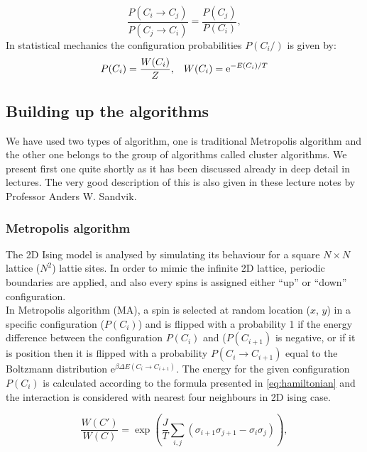 \documentclass[a4paper,8pt]{article}
\begin{document}
\begin{equation}
    \frac{P(C_i \rightarrow C_{j})}{P(C_j \rightarrow C_{i})} = \frac{P(C_j)}{P(C_i)},
\end{equation}
In statistical mechanics the configuration probabilities $P(C_{i}/)$ is given by:
\begin{equation}
    P(C_i) = \frac{W(C_i)}{Z}, \hspace{0.3cm} W(C_{i}) = \mathrm{e}^{-E(C_i)/T}
\end{equation}

\subsection{Building up the algorithms}
We have used two types of algorithm, one is traditional Metropolis algorithm\supercite{metropolis1953equation} and the other one belongs to the group of algorithms called cluster algorithms. We present first one quite shortly as it has been discussed already in deep detail in lectures. The very good description of this is also given in these lecture notes by Professor Anders W. Sandvik.\supercite{sandvik_lecture_notes}

\subsubsection{Metropolis algorithm}
The 2D Ising model is analysed by simulating its behaviour for a square $N \times N$ lattice ($N^2$) lattie sites. In order to mimic the infinite 2D lattice, periodic boundaries are applied, and also every spins is assigned either \enquote{up} or \enquote{down} configuration. \\

\noindent In Metropolis algorithm (MA), a spin is selected at random location ($x$, $y$) in a specific configuration ($P(C_i)$) and is flipped with a probability 1 if the energy difference between the configuration $P(C_i)$ and ($P(C_{i + 1})$ is negative, or if it is position then it is flipped with a probability $P(C_i \rightarrow C_{i + 1})$ equal to the Boltzmann distribution $\mathrm{e}^{\beta \Delta E(C_i \rightarrow C_{i+1})}$.  The energy for the given configuration $P(C_i)$ is calculated according to the formula presented in \ref{eq:hamiltonian} and the interaction is considered with nearest four neighbours in 2D ising case.

\begin{equation}
    \frac{W(C')}{W(C)} = \exp{ (\frac{J}{T} \underset{i,j}{\sum} (\sigma_{i+1} \sigma_{j+1} - \sigma_{i} \sigma_{j}) )}, \label{eq:weight}
\end{equation}
\end{document}
